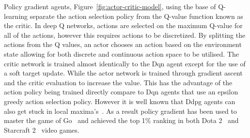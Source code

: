 Policy gradient agents, Figure~\ref{fig:actor-critic-model}, using the base of Q-learning separate the action
selection policy from the Q-value function known as the critic. In deep Q networks, actions are selected on the maximum
Q-value for all of the actions, however this requires actions to be discretized. By splitting the actions from the Q
values, an actor chooses an action based on the environment state allowing for both discrete and continuous action space
to be utilised. The critic network is trained almost identically to the Dqn agent except for the use of a soft target
update. While the actor network is trained through gradient ascent and the critic evaluation to increase the value. This
has the advantage of the action policy being trained directly compare to Dqn agents that use an epsilon greedy action
selection policy. However it is well known that Ddpg agents can also get stuck in local maxima's~\citep{ddpg-problems}.
As a result policy gradient has been used to master the game of Go~\citep{silver2017mastering} and achieved the top 1\%
ranking in both Dota 2~\citep{OpenAI_dota} and Starcraft 2~\citep{starcraft2} video games.